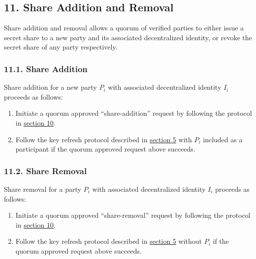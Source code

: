 \documentclass[
]{article}
\providecommand{\tightlist}{%
  \setlength{\itemsep}{0pt}\setlength{\parskip}{0pt}}
\begin{document}
\hypertarget{share-addition-and-removal}{%
\subsection{11. Share Addition and
Removal}\label{share-addition-and-removal}}

Share addition and removal allows a quorum of verified parties to either
issue a secret share to a new party and its associated decentralized
identity, or revoke the secret share of any party respectively.

\hypertarget{share-addition}{%
\subsubsection{11.1. Share Addition}\label{share-addition}}

Share addition for a new party \(P_i\) with associated decentralized
identity \(I_i\) proceeds as follows:

\begin{enumerate}
\def\labelenumi{\arabic{enumi}.}
\tightlist
\item
  Initiate a quorum approved ``share-addition'' request by following the
  protocol in \protect\hyperlink{quorum-approved-request}{section 10}.
\item
  Follow the key refresh protocol described in
  \protect\hyperlink{key-refresh}{section 5} with \(P_i\) included as a
  participant if the quorum approved request above succeeds.
\end{enumerate}

\hypertarget{share-removal}{%
\subsubsection{11.2. Share Removal}\label{share-removal}}

Share removal for a party \(P_i\) with associated decentralized identity
\(I_i\) proceeds as follows:

\begin{enumerate}
\def\labelenumi{\arabic{enumi}.}
\tightlist
\item
  Initiate a quorum approved ``share-removal'' request by following the
  protocol in \protect\hyperlink{quorum-approved-request}{section 10}.
\item
  Follow the key refresh protocol described in
  \protect\hyperlink{key-refresh}{section 5} without \(P_i\) if the
  quorum approved request above succeeds.
\end{enumerate}
\end{document}
